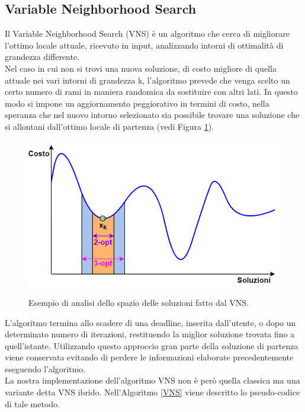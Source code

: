 \subsection{Variable Neighborhood Search}
Il Variable Neighborhood Search (VNS) è un algoritmo che cerca di migliorare l'ottimo locale attuale, ricevuto in input, analizzando intorni di ottimalità di grandezza differente.\\
Nel caso in cui non si trovi una nuova soluzione, di costo migliore di quella attuale nei vari intorni di grandezza k, l'algoritmo prevede che venga scelto un certo numero di rami in maniera randomica da sostituire con altri lati\cite{VNS_CITE}. In questo modo si impone un aggiornamento peggiorativo in termini di costo, nella speranza che nel nuovo intorno selezionato sia possibile trovare una soluzione che si allontani dall'ottimo locale di partenza (vedi Figura \ref{VNS_img}).\\
 \begin{figure}[H] 
\begin{center} 
  \includegraphics[scale=0.4]{Images/VNS}\\ 
  \caption{\footnotesize{Esempio di analisi dello spazio delle soluzioni fatto dal VNS.}}
  \label{VNS_img}
\end{center}
\end{figure}
L'algoritmo termina allo scadere di una deadline, inserita dall'utente, o dopo un determinato numero di iterazioni, restituendo la miglior soluzione trovata fino a quell'istante. Utilizzando questo approccio gran parte della soluzione di partenza viene conservata evitando di perdere le informazioni elaborate precedentemente eseguendo l'algoritmo.\\
La nostra implementazione dell'algoritmo VNS non è però quella classica ma una variante detta VNS ibrido\cite{hybrid_VNS}. Nell'Algoritmo \ref{VNS} viene descritto lo pseudo-codice di tale metodo.\\
